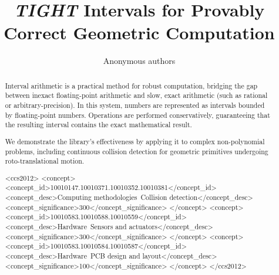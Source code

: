 \documentclass{egpubl}
\title[Short title here]%
      {\emph{TIGHT} Intervals for Provably Correct Geometric Computation}
\author[Anonymous]
{\parbox{\textwidth}{\centering Anonymous authors}}
\begin{document}

\maketitle
\begin{abstract}
Interval arithmetic is a practical method for robust computation, bridging the gap between  inexact floating-point arithmetic and slow, exact arithmetic (such as rational or arbitrary-precision). In this system, numbers are represented as intervals bounded by floating-point numbers. Operations are performed conservatively, guaranteeing that the resulting interval contains the exact mathematical result.

We demonstrate the library’s effectiveness by applying it to complex non-polynomial problems, including continuous collision detection for geometric primitives undergoing roto-translational motion.
\begin{CCSXML}
<ccs2012>
<concept>
<concept_id>10010147.10010371.10010352.10010381</concept_id>
<concept_desc>Computing methodologies~Collision detection</concept_desc>
<concept_significance>300</concept_significance>
</concept>
<concept>
<concept_id>10010583.10010588.10010559</concept_id>
<concept_desc>Hardware~Sensors and actuators</concept_desc>
<concept_significance>300</concept_significance>
</concept>
<concept>
<concept_id>10010583.10010584.10010587</concept_id>
<concept_desc>Hardware~PCB design and layout</concept_desc>
<concept_significance>100</concept_significance>
</concept>
</ccs2012>
\end{CCSXML}


\end{abstract}
\end{document}
